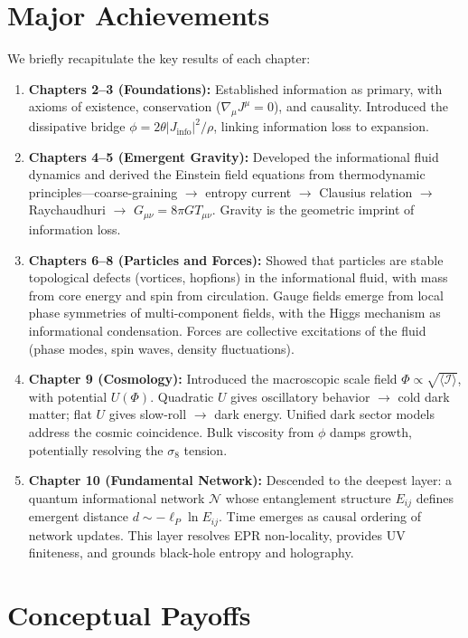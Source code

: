 \documentclass[12pt,a4paper]{book}
\newcommand{\I}{\mathcal{I}}
\begin{document}
\section{Major Achievements}

We briefly recapitulate the key results of each chapter:
\begin{enumerate}
    \item \textbf{Chapters 2–3 (Foundations):} Established information as primary, with axioms of existence, conservation ($\nabla_\mu J^\mu = 0$), and causality. Introduced the dissipative bridge $\phi = 2\theta |J_{\text{info}}|^2/\rho$, linking information loss to expansion.
    \item \textbf{Chapters 4–5 (Emergent Gravity):} Developed the informational fluid dynamics and derived the Einstein field equations from thermodynamic principles—coarse-graining $\rightarrow$ entropy current $\rightarrow$ Clausius relation $\rightarrow$ Raychaudhuri $\rightarrow$ $G_{\mu\nu} = 8\pi G T_{\mu\nu}$. Gravity is the geometric imprint of information loss.
    \item \textbf{Chapters 6–8 (Particles and Forces):} Showed that particles are stable topological defects (vortices, hopfions) in the informational fluid, with mass from core energy and spin from circulation. Gauge fields emerge from local phase symmetries of multi-component fields, with the Higgs mechanism as informational condensation. Forces are collective excitations of the fluid (phase modes, spin waves, density fluctuations).
    \item \textbf{Chapter 9 (Cosmology):} Introduced the macroscopic scale field $\Phi \propto \sqrt{\langle \I \rangle}$, with potential $U(\Phi)$. Quadratic $U$ gives oscillatory behavior $\rightarrow$ cold dark matter; flat $U$ gives slow-roll $\rightarrow$ dark energy. Unified dark sector models address the cosmic coincidence. Bulk viscosity from $\phi$ damps growth, potentially resolving the $\sigma_8$ tension.
    \item \textbf{Chapter 10 (Fundamental Network):} Descended to the deepest layer: a quantum informational network $\mathcal{N}$ whose entanglement structure $E_{ij}$ defines emergent distance $d \sim -\ell_P \ln E_{ij}$. Time emerges as causal ordering of network updates. This layer resolves EPR non-locality, provides UV finiteness, and grounds black-hole entropy and holography.
\end{enumerate}

\section{Conceptual Payoffs}
\end{document}
